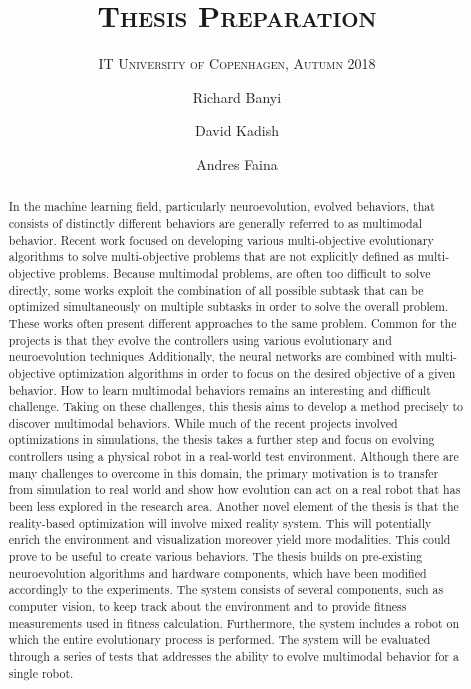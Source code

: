 \documentclass[format=acmsmall, review=false, screen=true]{acmart}
\author{Richard Banyi}
\affiliation{%
  \institution{IT University of Copenhagen}
  \streetaddress{Rued Langgaards Vej 7}
  \city{Copenhagen}
  \postcode{2300}
  \country{Denmark}
}
\author{David Kadish}
\affiliation{%
  \institution{Supervisor}
}
\affiliation{%
  \institution{IT University of Copenhagen}
}
\affiliation{%
  \institution{Robotics, Evolution, and Art Lab}
}
\author{Andres Faina}
\affiliation{%
  \institution{Supervisor}
}
\affiliation{%
  \institution{IT University of Copenhagen}
  \streetaddress{Rued Langgaards Vej 7}
  \city{Copenhagen}
  \postcode{2300}
  \country{Denmark}
}
\affiliation{%
  \institution{Robotics, Evolution, and Art Lab}
}
\title{\textsc{Thesis Preparation }}
\subtitle{\textsc{IT University of Copenhagen, Autumn 2018}}
\begin{document}
\begin{abstract}

In the machine learning field, particularly neuroevolution, evolved behaviors, that consists of distinctly different behaviors are generally referred to as multimodal behavior. Recent work focused on developing various multi-objective evolutionary algorithms to solve multi-objective problems that are not explicitly defined as multi-objective problems. Because multimodal problems, are often too difficult to solve directly, some works exploit the combination of all possible subtask that can be optimized simultaneously on multiple subtasks in order to solve the overall problem. These works often present different approaches to the same problem. Common for the projects is that they evolve the controllers using various evolutionary and neuroevolution techniques Additionally, the neural networks are combined with multi-objective optimization algorithms in order to focus on the desired objective of a given behavior. How to learn multimodal behaviors remains an interesting and difficult challenge. Taking on these challenges, this thesis aims to develop a method precisely to discover multimodal behaviors. While much of the recent projects involved optimizations in simulations, the thesis takes a further step and focus on evolving controllers using a physical robot in a real-world test environment. Although there are many challenges to overcome in this domain, the primary motivation is to transfer from simulation to real world and show how evolution can act on a real robot that has been less explored in the research area. Another novel element of the thesis is that the reality-based optimization will involve mixed reality system. This will potentially enrich the environment and visualization moreover yield more modalities. This could prove to be useful to create various behaviors. The thesis builds on pre-existing neuroevolution algorithms and hardware components, which have been modified accordingly to the experiments. The system consists of several components, such as computer vision, to keep track about the environment and to provide fitness measurements used in fitness calculation. Furthermore, the system includes a robot on which the entire evolutionary process is performed. The system will be evaluated through a series of tests that addresses the ability to evolve multimodal behavior for a single robot.

\end{abstract}

\maketitle
\end{document}
